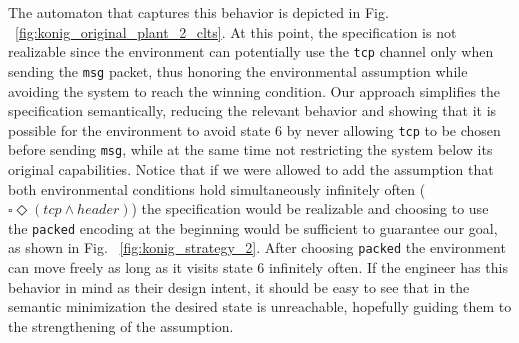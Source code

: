 The automaton that captures this behavior is depicted in Fig. ~\ref{fig:konig_original_plant_2_clts}. At this point, the specification is not realizable since the environment can potentially use the \texttt{tcp} channel only when sending the \texttt{msg} packet, thus honoring the environmental assumption while avoiding the system to reach the winning condition.
Our approach simplifies the specification semantically, reducing the relevant behavior and showing that it is possible for the environment to avoid state 6 by never allowing \texttt{tcp} to be chosen before sending \texttt{msg}, while at the same time not restricting the system below its original capabilities.
Notice that if we were allowed to add the assumption that both environmental conditions hold simultaneously infinitely often ($\square \Diamond (tcp \wedge header)$) the specification would be realizable and choosing to use the \texttt{packed} encoding at the beginning would be sufficient to guarantee our goal, as shown in Fig. ~\ref{fig:konig_strategy_2}. After choosing \texttt{packed} the environment can move freely as long as it visits state 6 infinitely often. If the engineer has this behavior in mind as their design intent, it should be easy to see that in the semantic minimization the desired state is unreachable, hopefully guiding them to the strengthening of the assumption. 


